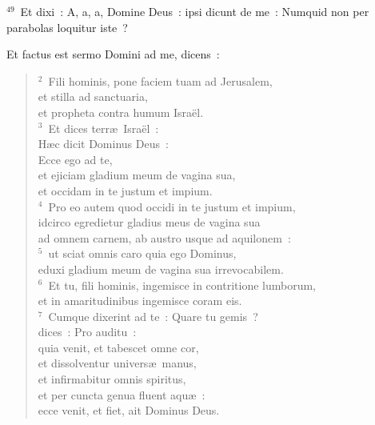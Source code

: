 ${}^{49}$~Et dixi~: A, a, a, Domine Deus~: ipsi dicunt de me~: Numquid non per parabolas loquitur iste~?

\lettrine[lines=10,image=true,loversize=0.05,lraise=-0.03]{E}{}t factus est sermo Domini ad me, dicens~:
\begin{flushleft}\begin{verse}\vspace{6pt}${}^{2}$~Fili hominis, pone faciem tuam ad Jerusalem,\\ et stilla ad sanctuaria,\\ et propheta contra humum Isra\"el.\\
${}^{3}$~Et dices terr\ae\ Isra\"el~:\\ H\ae c dicit Dominus Deus~:\\ Ecce ego ad te,\\ et ejiciam gladium meum de vagina sua,\\ et occidam in te justum et impium.\\
${}^{4}$~Pro eo autem quod occidi in te justum et impium,\\ idcirco egredietur gladius meus de vagina sua\\ ad omnem carnem, ab austro usque ad aquilonem~:\\
${}^{5}$~ut sciat omnis caro quia ego Dominus,\\ eduxi gladium meum de vagina sua irrevocabilem.\\
${}^{6}$~Et tu, fili hominis, ingemisce in contritione lumborum,\\ et in amaritudinibus ingemisce coram eis.\\
${}^{7}$~Cumque dixerint ad te~: Quare tu gemis~?\\ dices~: Pro auditu~:\\ quia venit, et tabescet omne cor,\\ et dissolventur univers\ae\ manus,\\ et infirmabitur omnis spiritus,\\ et per cuncta genua fluent aqu\ae~:\\ ecce venit, et fiet, ait Dominus Deus.\end{verse}\end{flushleft}


